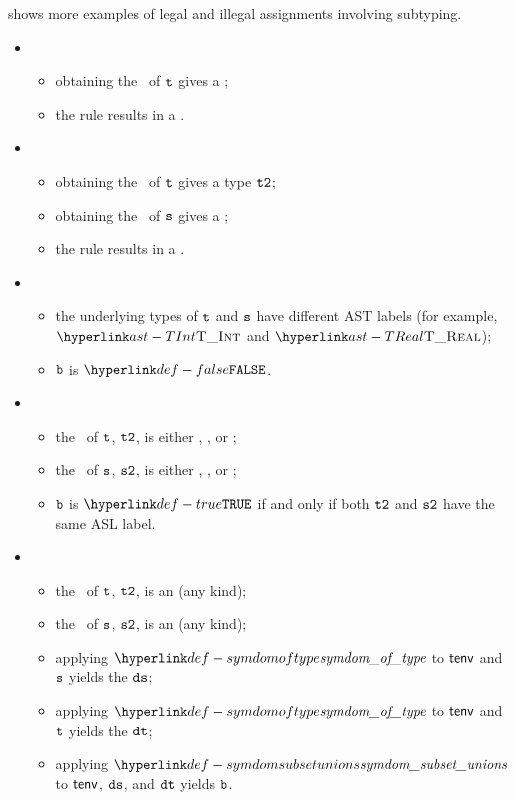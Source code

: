  shows more examples of legal and illegal assignments involving
subtyping.

\ProseParagraph
\OneApplies
\begin{itemize}
\item {}
  \begin{itemize}
  \item obtaining the \underlyingtype\ of $\texttt{t}$ gives a \typingerrorterm{};
  \item the rule results in a \typingerrorterm{}.
  \end{itemize}

\item {}
  \begin{itemize}
    \item obtaining the \underlyingtype\ of $\texttt{t}$ gives a type $\texttt{t2}$;
    \item obtaining the \underlyingtype\ of $\texttt{s}$ gives a \typingerrorterm{};
    \item the rule results in a \typingerrorterm{}.
    \end{itemize}

\item {}
  \begin{itemize}
  \item the underlying types of $\texttt{t}$ and $\texttt{s}$ have different AST labels
  (for example, $\TInt$ and $\TReal$);
  \item $\texttt{b}$ is $\False$.
  \end{itemize}

\item {}
  \begin{itemize}
  \item the \underlyingtype\ of $\texttt{t}$, $\texttt{t2}$, is either \realtypeterm{}, \stringtypeterm{}, or \booleantypeterm{};
  \item the \underlyingtype\ of $\texttt{s}$, $\texttt{s2}$, is either \realtypeterm{}, \stringtypeterm{}, or \booleantypeterm{};
  \item $\texttt{b}$ is $\True$ if and only if both $\texttt{t2}$ and $\texttt{s2}$ have the same ASL label.
  \end{itemize}

\item {}
  \begin{itemize}
  \item the \underlyingtype\ of $\texttt{t}$, $\texttt{t2}$, is an \integertypeterm{} (any kind);
  \item the \underlyingtype\ of $\texttt{s}$, $\texttt{s2}$, is an \integertypeterm{} (any kind);
  \item applying $\symdomoftype$ to $\textsf{tenv}$ and $\texttt{s}$ yields the \symbolicdomainterm{} $\texttt{ds}$;
  \item applying $\symdomoftype$ to $\textsf{tenv}$ and $\texttt{t}$ yields the \symbolicdomainterm{} $\texttt{dt}$;
  \item applying $\symdomsubsetunions$ to $\textsf{tenv}$, $\texttt{ds}$, and $\texttt{dt}$ yields $\texttt{b}$.
  \end{itemize}


\end{itemize}
